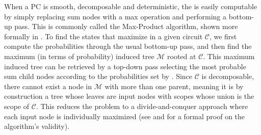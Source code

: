 When a PC is smooth, decomposable and deterministic, the \map{} is easily computable by simply
replacing sum nodes with a max operation and performing a bottom-up \evi{} pass. This is commonly
called the Max-Product algorithm, shown more formally in . To find the states that
maximize  in a given circuit $\mathcal{C}$, we first compute the \map{} probabilities
through the usual bottom-up pass, and then find the maximum (in terms of probability) induced tree
$\mathcal{M}$ rooted at $\mathcal{C}$. This maximum induced tree can be retrieved by a top-down
pass selecting the most probable sum child nodes according to the probabilities set by \map{}.
Since $\mathcal{C}$ is decomposable, there cannot exist a node in $\mathcal{M}$ with more than one
parent, meaning it is by construction a tree whose leaves are input nodes with scopes whose union
is the scope of $\mathcal{C}$. This reduces the problem to a divide-and-conquer approach where each
input node is individually maximized (see  and  for a formal
proof on the algorithm's validity).

